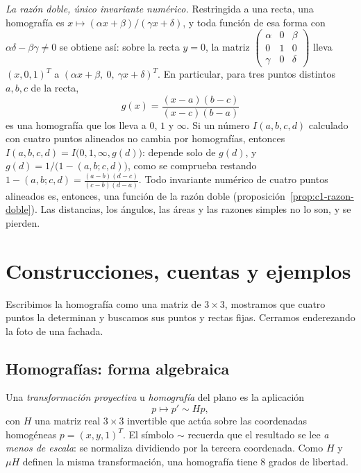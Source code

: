 \emph{La razón doble, único invariante numérico.} Restringida a una recta, una homografía es
\(x\mapsto(\alpha x+\beta)/(\gamma x+\delta)\), y toda función de esa forma con
\(\alpha\delta-\beta\gamma\neq0\) se obtiene así: sobre la recta \(y=0\), la matriz
\(\left(\begin{smallmatrix}\alpha&0&\beta\\0&1&0\\\gamma&0&\delta\end{smallmatrix}\right)\)
lleva \((x,0,1)^T\) a \((\alpha x+\beta,\ 0,\ \gamma x+\delta)^T\). En particular, para tres
puntos distintos \(a,b,c\) de la recta,
\[
  g(x)=\frac{(x-a)(b-c)}{(x-c)(b-a)}
\]
es una homografía que los lleva a \(0\), \(1\) y \(\infty\). Si un número \(I(a,b,c,d)\)
calculado con cuatro puntos alineados no cambia por homografías, entonces
\(I(a,b,c,d)=I\bigl(0,1,\infty,g(d)\bigr)\): depende solo de \(g(d)\), y
\(g(d)=1/\bigl(1-(a,b;c,d)\bigr)\), como se comprueba restando
\(1-(a,b;c,d)=\frac{(a-b)(d-c)}{(c-b)(d-a)}\). Todo invariante numérico de cuatro puntos
alineados es, entonces, una función de la razón doble (proposición~\ref{prop:c1-razon-doble}).
Las distancias, los ángulos, las áreas y las razones simples no lo son, y se pierden.

\section{Construcciones, cuentas y ejemplos}

Escribimos la homografía como una matriz de \(3\times3\), mostramos que cuatro puntos la determinan y buscamos sus puntos y rectas fijas. Cerramos enderezando la foto de una fachada.

{\small\vspace{1mm}\par}
{\small\vspace{1mm}\par}

\subsection{Homografías: forma algebraica}\label{sec:homografias}

\begin{definicion}[Homografía]
Una \emph{transformación proyectiva} u \emph{homografía} del plano es la
aplicación
\[
  \boxed{p\longmapsto p'\sim Hp},
\]
con \(H\) una matriz real \(3\times3\) invertible que actúa sobre las coordenadas
homogéneas \(p=(x,y,1)^T\). El símbolo \(\sim\) recuerda que el resultado se lee \emph{a menos
de escala}: se normaliza dividiendo por la tercera coordenada. Como \(H\) y \(\mu H\)
definen la misma transformación, una homografía tiene \(8\) grados de libertad.
\end{definicion}

